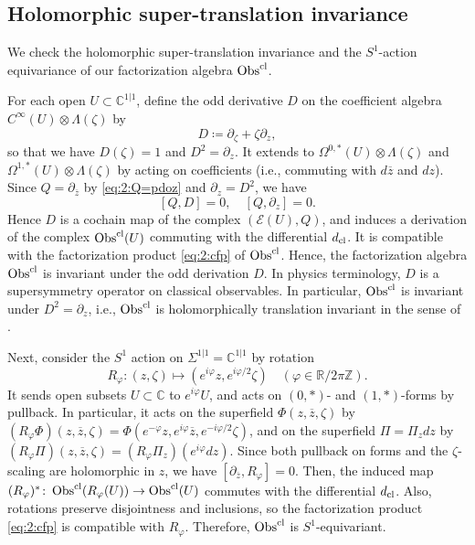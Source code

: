 \documentclass[final,reqno]{amsart}
\numberwithin{equation}{section}
\theoremstyle{definition}
\newcommand{\ol}{\overline}
\newcommand{\ceq}{\coloneqq} %
\newcommand{\lmto}{\longmapsto}
\newcommand{\tcl}{\textup{cl}}
\newcommand{\bbC}{\mathbb{C}}
\newcommand{\bbR}{\mathbb{R}}
\newcommand{\bbZ}{\mathbb{Z}}
\newcommand{\sC}{\mathbb{C}^{1|1}}
\newcommand{\clE}{\mathcal{E}}
\newcommand{\pd}{\partial}
\newcommand{\sSig}{\Sigma^{1|1}}
\newcommand{\pair}[1]{\langle #1 \rangle}
\newcommand{\cObs}[1]{\mathop{\Obs^{\textup{cl}}_{#1}}}
\DeclareMathOperator{\Obs}{Obs}
\begin{document}
\subsection{Holomorphic super-translation invariance}\label{ss:2.7}

We check the holomorphic super-translation invariance and 
the $S^1$-action equivariance of our factorization algebra $\cObs{}$.

For each open $U \subset \sC$, define the odd derivative $D$ 
on the coefficient algebra $C^\infty(U) \otimes \Lambda(\zeta)$ by
\[
 D \ceq \pd_\zeta + \zeta \pd_z,
\]
so that we have $D(\zeta)=1$ and $D^2=\pd_z$.
It extends to $\Omega^{0,*}(U)\otimes\Lambda(\zeta)$ and 
$\Omega^{1,*}(U)\otimes\Lambda(\zeta)$ by acting on coefficients 
(i.e., commuting with $d\ol{z}$ and $dz$).
Since $Q=\pd_{\ol{z}}$ by \eqref{eq:2:Q=pdoz} and $\pd_z=D^2$, we have 
\[
 [Q, D] = 0, \quad [Q,\pd_z]=0.
\]
Hence $D$ is a cochain map of the complex $(\clE(U),Q)$,
and induces a derivation of the complex $\cObs{}(U)$ 
commuting with the differential $d_{\tcl}$.
It is compatible with the factorization product \eqref{eq:2:cfp} of $\cObs{}$.
Hence, the factorization algebra $\cObs{}$ is invariant 
under the odd derivation $D$. 
In physics terminology, 
$D$ is a supersymmetry operator on classical observables.
In particular, $\cObs{}$ is invariant under $D^2=\pd_z$, 
i.e., $\cObs{}$ is holomorphically translation invariant 
in the sense of \cite{CG1,CG2}.

Next, consider the $S^1$ action on $\sSig=\sC$ by rotation 
\[
 R_\varphi\colon (z,\zeta) \lmto (e^{i\varphi}z,e^{i\varphi/2}\zeta) \quad
 (\varphi\in\bbR/2\pi\bbZ).
\]
It sends open subsets $U\subset\bbC$ to $e^{i\varphi}U$, 
and acts on $(0,*)$- and $(1,*)$-forms by pullback.
In particular, it acts on the superfield $\Phi(z,\ol{z},\zeta)$ by 
$(R_\varphi \Phi)(z,\ol{z},\zeta)
=\Phi(e^{-\varphi}z,e^{i\varphi}\ol{z},e^{-i\varphi/2}\zeta)$,
and on the superfield $\Pi=\Pi_zdz$ by 
$(R_\varphi \Pi)(z,\ol{z},\zeta)=(R_\varphi \Pi_z)(e^{i\varphi}dz)$.
Since both pullback on forms and the $\zeta$-scaling are holomorphic in $z$, 
we have $[\pd_{\ol{z}},R_\varphi]=0$.
Then, the induced map 
$(R_\varphi)^*\colon \cObs{}(R_\varphi(U)) \to \cObs{}(U)$
commutes with the differential $d_{\tcl}$.
Also, rotations preserve disjointness and inclusions, 
so the factorization product \eqref{eq:2:cfp} is compatible with $R_\varphi$.
Therefore, $\cObs{}$ is $S^1$-equivariant.
\end{document}
